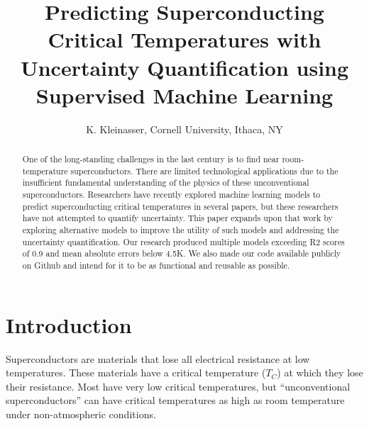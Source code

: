 \documentclass[twocolumn, nofootinbib, secnumarabic, amssymb, nobibnotes, aps, prd]{revtex4-2}
\begin{document}

\begin{abstract}
One of the long-standing challenges in the last century is to find near room-temperature superconductors. There are limited technological applications due to the insufficient fundamental understanding of the physics of these unconventional superconductors. Researchers have recently explored machine learning models to predict superconducting critical temperatures in several papers, but these researchers have not attempted to quantify uncertainty. This paper expands upon that work by exploring alternative models to improve the utility of such models and addressing the  uncertainty quantification. Our research produced multiple models exceeding R2 scores of 0.9 and mean absolute errors below 4.5K. We also made our code available publicly on Github and intend for it to be as functional and reusable as possible. 
\end{abstract}


\title{Predicting Superconducting Critical Temperatures with Uncertainty Quantification using Supervised Machine Learning}

\author{K. Kleinasser, Cornell University, Ithaca, NY}

\maketitle

\section{Introduction}
Superconductors are materials that lose all electrical resistance at low temperatures. These materials have a critical temperature ($T_C$) at which they lose their resistance. Most have very low critical temperatures, but “unconventional superconductors” can have critical temperatures as high as room temperature under non-atmospheric conditions. 
\end{document}

